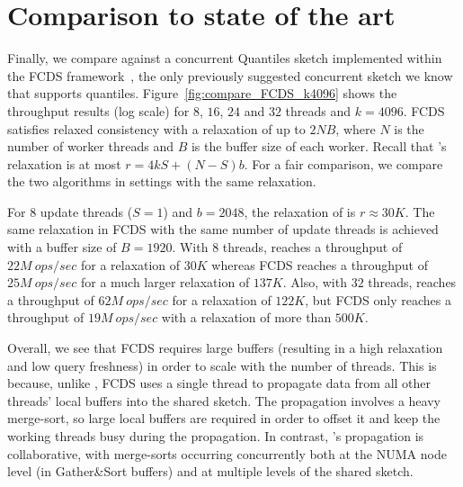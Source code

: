 \section{Comparison to state of the art}
\label{sec:compare} 
Finally, we compare \mysketch against a concurrent Quantiles sketch implemented within the FCDS framework~\cite{Rinberg_2020_fast_sketches}, the only previously suggested concurrent sketch we know that supports quantiles. Figure~\ref{fig:compare_FCDS_k4096} shows the throughput results (log scale) for $8$, $16$, $24$ and $32$ threads and $k=4096$.
FCDS satisfies relaxed consistency with a relaxation of up to $2NB$, where $N$ is the number of worker threads and $B$ is the buffer size of each worker. Recall that \mysketch's relaxation is at most $r = 4kS+(N-S)b$. For a fair comparison, we compare the two algorithms in settings with the same relaxation.

For $8$ update threads ($S=1$) and $b=2048$, the relaxation of \mysketch is $r\approx 30K$. The same relaxation in FCDS with the same number of update threads is achieved with a buffer size of $B=1920$.
With $8$ threads, \mysketch reaches a throughput of $22M\ ops/sec$ for a relaxation of $30K$ whereas FCDS reaches a throughput of $25M\ ops/sec$ for a much larger relaxation of $137K$. Also, with $32$ threads, \mysketch reaches a throughput of $62M\ ops/sec$ for a relaxation of $122K$, but FCDS only reaches a throughput of $19M\ ops/sec$ with a relaxation of more than $500K$.

Overall, we see that FCDS requires large buffers (resulting in a high relaxation and low query freshness) in order to scale with the number of threads. This is because, unlike \mysketch, FCDS uses a single thread to propagate data from all other threads' local buffers into the shared sketch. The propagation involves a heavy merge-sort, so large local buffers are required in order to offset it and keep the working threads busy during the propagation. In contrast, \mysketch's propagation is collaborative, with merge-sorts occurring concurrently both at the NUMA node level (in Gather\&Sort buffers) and at multiple levels of the shared sketch.



